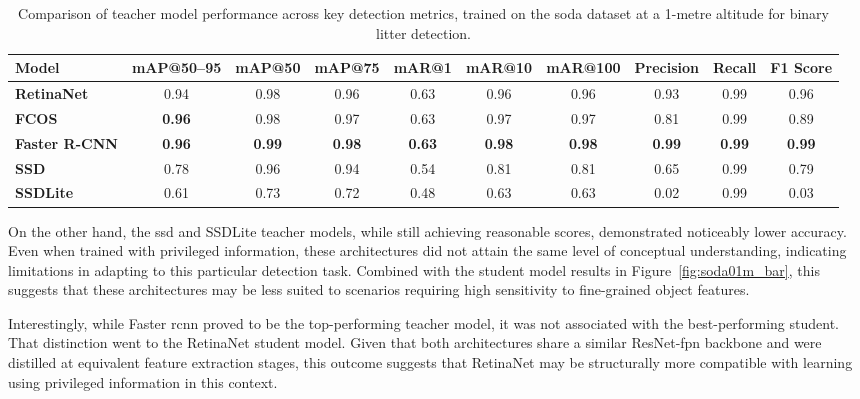 \begin{table}[!ht]
    \centering
    \begin{adjustbox}{max width=\textwidth}
    \renewcommand{\arraystretch}{1.5}
    \begin{tabular}{|l|c|c|c|c|c|c|c|c|c|}
        \hline%
        \textbf{Model} & \textbf{mAP@50--95} & \textbf{mAP@50} & \textbf{mAP@75} & \textbf{mAR@1} & \textbf{mAR@10} & \textbf{mAR@100} & \textbf{Precision} & \textbf{Recall} & \textbf{F1 Score} \\ \hline \hline
        \textbf{RetinaNet} & 0.94 & 0.98 & 0.96 & 0.63 & 0.96 & 0.96 & 0.93 & 0.99 & 0.96 \\\hline
        \textbf{FCOS} & \textbf{0.96} & 0.98 & 0.97 & 0.63 & 0.97 & 0.97 & 0.81 & 0.99 & 0.89 \\\hline
        \textbf{Faster R-CNN} & \textbf{0.96} & \textbf{0.99} & \textbf{0.98} & \textbf{0.63} & \textbf{0.98} & \textbf{0.98} & \textbf{0.99} & \textbf{0.99} & \textbf{0.99} \\\hline
        \textbf{SSD} & 0.78 & 0.96 & 0.94 & 0.54 & 0.81 & 0.81 & 0.65 & 0.99 & 0.79 \\\hline
        \textbf{SSDLite} & 0.61 & 0.73 & 0.72 & 0.48 & 0.63 & 0.63 & 0.02 & 0.99 & 0.03 \\
        \hline%
    \end{tabular}
    \renewcommand{\arraystretch}{1}
    \end{adjustbox}
    \caption{Comparison of teacher model performance across key detection metrics, trained on the \gls{soda} dataset at a 1-metre altitude for binary litter detection.}
    \label{tab:teacher_model_metrics_soda01m}
\end{table}

On the other hand, the \gls{ssd} and SSDLite teacher models, while still achieving reasonable scores, demonstrated noticeably lower accuracy. Even when trained with privileged information, these architectures did not attain the same level of conceptual understanding, indicating limitations in adapting to this particular detection task. Combined with the student model results in Figure~\ref{fig:soda01m_bar}, this suggests that these architectures may be less suited to scenarios requiring high sensitivity to fine-grained object features.

Interestingly, while Faster \gls{rcnn} proved to be the top-performing teacher model, it was not associated with the best-performing student. That distinction went to the RetinaNet student model. Given that both architectures share a similar ResNet-\gls{fpn} backbone and were distilled at equivalent feature extraction stages, this outcome suggests that RetinaNet may be structurally more compatible with learning using privileged information in this context.

